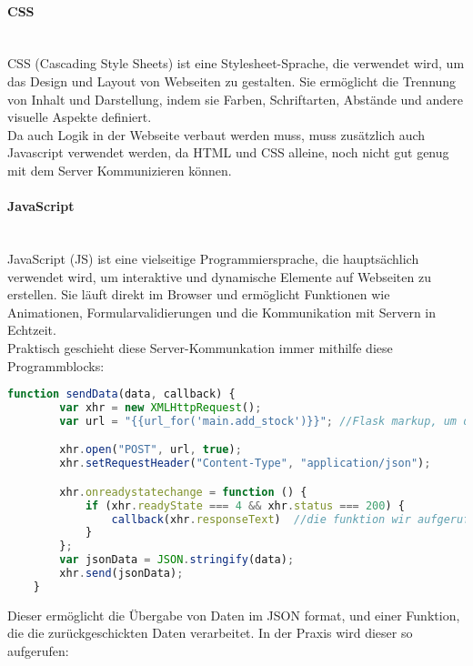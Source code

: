 \paragraph{CSS}\mbox{}\\
CSS (Cascading Style Sheets) ist eine Stylesheet-Sprache, die verwendet wird, um das Design und Layout von Webseiten zu gestalten. Sie ermöglicht die Trennung von Inhalt und Darstellung, indem sie Farben, Schriftarten, Abstände und andere visuelle Aspekte definiert.\cite{chatgpt}\\

Da auch Logik in der Webseite verbaut werden muss, muss zusätzlich auch Javascript verwendet werden, da HTML und CSS alleine, noch nicht gut genug mit dem Server Kommunizieren können.

\paragraph{JavaScript}\mbox{}\\
JavaScript (JS) ist eine vielseitige Programmiersprache, die hauptsächlich verwendet wird, um interaktive und dynamische Elemente auf Webseiten zu erstellen. Sie läuft direkt im Browser und ermöglicht Funktionen wie Animationen, Formularvalidierungen und die Kommunikation mit Servern in Echtzeit.\cite{chatgpt}\\

Praktisch geschieht diese Server-Kommunkation immer mithilfe diese Programmblocks:

\begin{lstlisting}[language=JavaScript]
    function sendData(data, callback) {
        var xhr = new XMLHttpRequest();
        var url = "{{url_for('main.add_stock')}}"; //Flask markup, um die richtige url zu erreichen, dies wird vor ausgabe auf der Webseite noch eingesetzt

        xhr.open("POST", url, true);
        xhr.setRequestHeader("Content-Type", "application/json");

        xhr.onreadystatechange = function () {
            if (xhr.readyState === 4 && xhr.status === 200) {
                callback(xhr.responseText)  //die funktion wir aufgerufen
            }
        };
        var jsonData = JSON.stringify(data);
        xhr.send(jsonData);
    }
\end{lstlisting}

Dieser ermöglicht die Übergabe von Daten im JSON format, und einer Funktion, die die zurückgeschickten Daten verarbeitet. In der Praxis wird dieser so aufgerufen:

